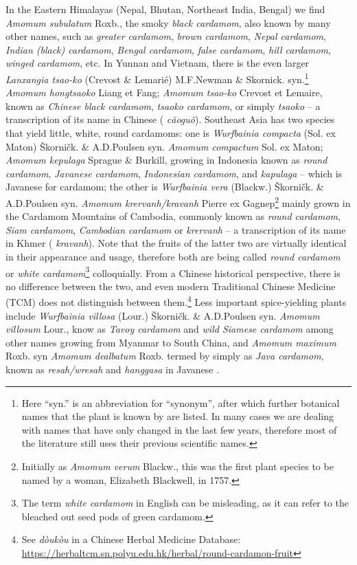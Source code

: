 \documentclass[12pt]{article}
\newcommand{\tc}[1]{\traditionalchinesefont{#1}\rmfamily}
\newcommand{\km}[1]{\khmerfont{#1}\rmfamily}
\newcommand{\jv}[1]{\javanesefont{#1}\rmfamily}
\begin{document}
In the Eastern Himalayas (Nepal, Bhutan, Northeast India, Bengal) we find \textit{Amomum subulatum} Roxb., the smoky \textit{black cardamom}, also known by many other names, such as \textit{greater cardamom}, \textit{brown cardamom}, \textit{Nepal cardamom}, \textit{Indian (black) cardamom}, \textit{Bengal cardamom}, \textit{false cardamom}, \textit{hill cardamom}, \textit{winged cardamom}, etc. In Yunnan and Vietnam, there is the even larger \textit{Lanxangia tsao-ko} (Crevost \& Lemarié) M.F.Newman \& Skornick. syn.\footnote{Here ``syn.'' is an abbreviation for ``synonym'', after which further botanical names that the plant is known by are listed. In many cases we are dealing with names that have only changed in the last few years, therefore most of the literature still uses their previous scientific names.} \textit{Amomum hongtsaoko} Liang et Fang; \textit{Amomum tsao-ko} Crevost et Lemaire, known as \textit{Chinese black cardamom}, \textit{tsaoko cardamom}, or simply \textit{tsaoko} -- a transcription of its name in Chinese (\tc{草果} \textit{cǎoguǒ}). Southeast Asia has two species that yield little, white, round cardamoms: one is \textit{Wurfbainia compacta} (Sol. ex Maton) Škorničk. \& A.D.Poulsen syn. \textit{Amomum compactum} Sol. ex Maton; \textit{Amomum kepulaga} Sprague \& Burkill, growing in Indonesia known as \textit{round cardamom}, \textit{Javanese cardamom}, \textit{Indonesian cardamom}, and \textit{kapulaga} -- which is Javanese for cardamom;
the other is \textit{Wurfbainia vera} (Blackw.) Škorničk. \& A.D.Poulsen syn. \textit{Amomum krervanh/kravanh} Pierre ex Gagnep\footnote{Initially as \textit{Amomum verum} Blackw., this was the first plant species to be named by a woman, Elizabeth Blackwell, in 1757.} mainly grown in the Cardamom Mountains of Cambodia, commonly known as \textit{round cardamom}, \textit{Siam cardamom}, \textit{Cambodian cardamom} or \textit{krervanh} -- a transcription of its name in Khmer (\km{ក្រវាញ} \textit{kravanh}). Note that the fruits of the latter two are virtually identical in their appearance and usage, therefore both are being called \textit{round cardamom} or \textit{white cardamom}\footnote{The term \textit{white cardamom} in English can be misleading, as it can refer to the bleached out seed pods of green cardamom.} colloquially. From a Chinese historical perspective, there is no difference between the two, and even modern Traditional Chinese Medicine (TCM) does not distinguish between them.\footnote{See \textit{dòukòu} in a Chinese Herbal Medicine Database: \url{https://herbaltcm.sn.polyu.edu.hk/herbal/round-cardamon-fruit}} Less important spice-yielding plants include \textit{Wurfbainia villosa} (Lour.) Škorničk. \& A.D.Poulsen syn. \textit{Amomum villosum} Lour., know as \textit{Tavoy cardamom} and \textit{wild Siamese cardamom} among other names growing from Myanmar to South China, and \textit{Amomum maximum}	Roxb. syn \textit{Amomum dealbatum} Roxb. termed by \textcite{vanwyk_2014_culinary} simply as \textit{Java cardamom}, known as \textit{resah/wresah} and \textit{hanggasa} in Javanese \parencite{burkill_1966_dictionary}. 
\end{document}
